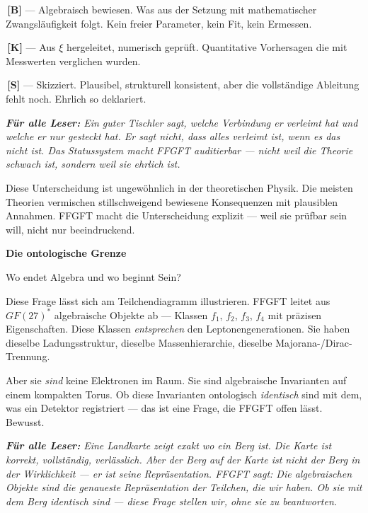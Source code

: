 \documentclass[11pt,oneside]{book}
\newcommand{\status}[1]{\penalty10000\,{\scriptsize\textcolor{gray!60}{[#1]}}}
\newenvironment{laierspur}{%
  \par\vspace{4pt}%
  \noindent\small\itshape\color{blue!60!black}%
  \textbf{Für alle Leser:}\enspace\ignorespaces}{%
  \par\vspace{4pt}\normalsize\normalfont\normalcolor}
\begin{document}
\textbf{\status{B}} — Algebraisch bewiesen. Was aus der Setzung mit mathematischer
Zwangsläufigkeit folgt. Kein freier Parameter, kein Fit, kein Ermessen.


\textbf{\status{K}} — Aus $\xi$ hergeleitet, numerisch geprüft. Quantitative Vorhersagen
die mit Messwerten verglichen wurden.


\textbf{\status{S}} — Skizziert. Plausibel, strukturell konsistent, aber die vollständige
Ableitung fehlt noch. Ehrlich so deklariert.


\begin{laierspur}
Ein guter Tischler sagt, welche Verbindung er verleimt hat
und welche er nur gesteckt hat. Er sagt nicht, dass alles verleimt ist,
wenn es das nicht ist. Das Statussystem macht FFGFT auditierbar —
nicht weil die Theorie schwach ist, sondern weil sie ehrlich ist.
\end{laierspur}

Diese Unterscheidung ist ungewöhnlich in der theoretischen Physik. Die
meisten Theorien vermischen stillschweigend bewiesene Konsequenzen mit
plausiblen Annahmen. FFGFT macht die Unterscheidung explizit — weil sie
prüfbar sein will, nicht nur beeindruckend.


\textbf{Die ontologische Grenze}


Wo endet Algebra und wo beginnt Sein?


Diese Frage lässt sich am Teilchendiagramm illustrieren. FFGFT leitet aus
$GF(27)^*$ algebraische Objekte ab — Klassen {$f_1$, $f_2$, $f_3$, $f_4$} mit präzisen
Eigenschaften. Diese Klassen \textit{entsprechen} den Leptonengenerationen. Sie
haben dieselbe Ladungsstruktur, dieselbe Massenhierarchie, dieselbe
Majorana-/Dirac-Trennung.


Aber sie \textit{sind} keine Elektronen im Raum. Sie sind algebraische Invarianten
auf einem kompakten Torus. Ob diese Invarianten ontologisch \textit{identisch} sind
mit dem, was ein Detektor registriert — das ist eine Frage, die FFGFT offen
lässt. Bewusst.


\begin{laierspur}
Eine Landkarte zeigt exakt wo ein Berg ist. Die Karte ist
korrekt, vollständig, verlässlich. Aber der Berg auf der Karte ist nicht
der Berg in der Wirklichkeit — er ist seine Repräsentation. FFGFT sagt:
Die algebraischen Objekte sind die genaueste Repräsentation der Teilchen,
die wir haben. Ob sie mit dem Berg identisch sind — diese Frage stellen
wir, ohne sie zu beantworten.
\end{laierspur}
\end{document}
